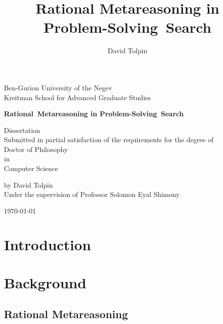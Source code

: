 \documentclass[oneside]{report}
\title {Rational Metareasoning in Problem-Solving~Search}
\author {David Tolpin}
\begin{document}
\begin{titlepage}
\begin{center}
{\large Ben-Gurion University of the Negev
\\
Kreitman School for Advanced Graduate Studies}
\vspace{1in}

{\bf\LARGE Rational~Metareasoning in Problem-Solving~Search}
\vspace{1in}

{\large Dissertation\\
Submitted in partial satisfaction of the requirements for the degree of\\
Doctor of Philosophy\\
in\\
Computer Science
\\
\vspace{1in}

by David Tolpin
\\
Under the supervision of Professor Solomon Eyal Shimony
\\
\vfill

\today}

\vspace{1in}

\end{center}
\end{titlepage}


\setcounter{page}{1}



\setcounter{tocdepth}{5}
\tableofcontents

\newpage
\setcounter{page}{1}

\chapter{Introduction}
\label{ch:intro}


\chapter{Background}
\label{ch:bg}

\section{Rational Metareasoning}
\label{sec:ratimeta}

\end{document}

